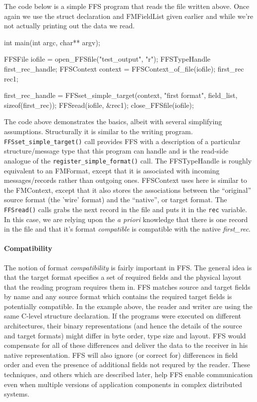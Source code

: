 The code below is a simple FFS program that reads the file written above.
Once again we use the struct declaration and FMFieldList given earlier and
while we're not actually printing out the data we read.
\begin{Code}
int
main(int argc, char** argv);
{
    FFSFile iofile = open_FFSfile("test_output", "r");
    FFSTypeHandle first_rec_handle;
    FFSContext context = FFSContext_of_file(iofile);
    first_rec rec1;

    first_rec_handle = FFSset_simple_target(context, "first format", field_list, sizeof(first_rec));
    FFSread(iofile, &rec1);
    close_FFSfile(iofile);
}
\end{Code}
The code above demonstrates the basics, albeit with several simplifying
assumptions.  Structurally it is similar to the writing program.  {\tt
  FFSset_simple_target()} call provides FFS with a description of a
particular structure/message type that this program can handle and is the
read-side analogue of the {\tt register_simple_format()} call. The
FFSTypeHandle is roughly equivalent to an FMFormat, except that it is
associated with incoming messages/records rather than outgoing ones.
FFSContext uses here is similar to the FMContext, except that it also stores
the associations between the ``original'' source format (the 'wire' format)
and the ``native'', or target format.  The {\tt FFSread()} calls
grabs the next record in the file and puts it in the {\tt rec} variable.  In
this case, we are relying upon the {\it a priori} knowledge that there is
one record in the file and that it's format {\it compatible} is compatible
with the native {\it first_rec}.

\paragraph{Compatibility} The notion of format {\it compatibility} is fairly
important in FFS.  The general idea is that the target format specifies a
set of required fields and the physical layout that the reading program
requires them in.  FFS matches source and target fields by name and any
source format which contains the required target fields is potentially
compatible.  In the example above, the reader and writer are using the same
C-level structure declaration.  If the programs were executed on different
architectures, their binary representations (and hence the details of the
source and target formats) might differ in byte order, type size and
layout.  FFS would compensate for all of these differences and deliver the
data to the receiver in his native representation.  FFS will also ignore (or
correct for) differences in field order and even the presence of additional
fields not requred by the reader.  These techniques, and others which are
described later, help FFS enable communication even when multiple versions
of application components in complex distributed systems.


